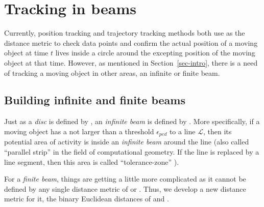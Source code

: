 

\section{Tracking in beams}
\label{sec:rectangle}
Currently, position tracking and trajectory tracking methods both use \sed as the distance metric to check data points and confirm the actual position of a moving object at time $t$ lives inside a circle around the excepting position of the moving object at that time.
{However, as mentioned in Section~\ref{sec-intro}, there is a need of tracking a moving object in other areas, \eg an infinite or finite beam.}
%

\subsection{Building infinite and finite beams}

Just as a \emph{disc} is defined by \sed, an \emph{infinite beam} is defined by \ped. More specifically, if a moving object has a \ped not larger than a threshold $\epsilon_{ped}$ to a line $\mathcal{L}$, then its potential area of activity is inside an \emph{infinite beam} around the line (also called ``parallel strip'' \cite{Chen:Space,Daescu:metric} in the field of computational geometry. If the line is replaced by a line segment, then this area is called ``tolerance-zone'' \cite{Imai:Optimal}).

For a \emph{finite beam}, things are getting a little more complicated as it cannot be defined by any single distance metric of \ped or \sed. 
Thus, we develop a new distance metric for it, \ie the binary Euclidean distances of \sed and \ped.



